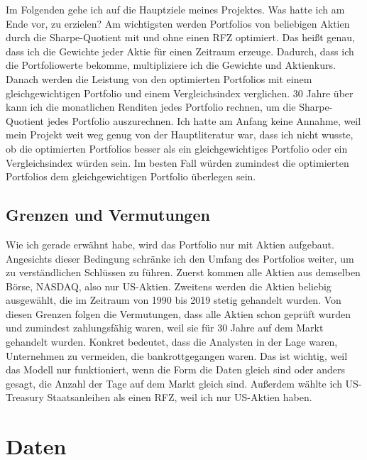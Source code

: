\documentclass[12pt]{article}
\begin{document}
            Im Folgenden gehe ich auf die Hauptziele meines Projektes. 
            Was hatte ich am Ende vor, zu erzielen? 
            Am wichtigsten werden Portfolios von beliebigen Aktien durch die Sharpe-Quotient mit und
            ohne einen RFZ optimiert. Das heißt genau, dass ich die Gewichte jeder Aktie für einen Zeitraum erzeuge. 
            Dadurch, dass ich die Portfoliowerte bekomme, multipliziere ich die Gewichte und Aktienkurs. 
            Danach werden die Leistung von den optimierten Portfolios mit einem gleichgewichtigen Portfolio und 
            einem Vergleichsindex verglichen. 30 Jahre über kann ich die monatlichen Renditen jedes Portfolio rechnen, 
            um die Sharpe-Quotient jedes Portfolio auszurechnen. 
            Ich hatte am Anfang keine Annahme, weil mein Projekt weit weg genug von der Hauptliteratur \cite{zhang2020} war, 
            dass ich nicht wusste, ob die optimierten Portfolios besser als ein gleichgewichtiges Portfolio oder 
            ein Vergleichsindex würden sein. 
            Im besten Fall würden zumindest die optimierten Portfolios dem gleichgewichtigen Portfolio überlegen sein.

        \subsection{Grenzen und Vermutungen}
    
            Wie ich gerade erwähnt habe, wird das Portfolio nur mit Aktien aufgebaut. 
            Angesichts dieser Bedingung schränke ich den Umfang des Portfolios weiter, 
            um zu verständlichen Schlüssen zu führen. Zuerst kommen alle Aktien aus demselben Börse, NASDAQ, also nur US-Aktien. 
            Zweitens werden die Aktien beliebig ausgewählt, die im Zeitraum von 1990 bis 2019 stetig gehandelt wurden. 
            Von diesen Grenzen folgen die Vermutungen, dass alle Aktien schon geprüft wurden und zumindest zahlungsfähig waren,
            weil sie für 30 Jahre auf dem Markt gehandelt wurden. 
            Konkret bedeutet, dass die Analysten in der Lage waren, Unternehmen zu vermeiden, die bankrottgegangen waren. 
            Das ist wichtig, weil das Modell nur funktioniert, wenn die Form die Daten gleich sind oder anders gesagt, 
            die Anzahl der Tage auf dem Markt gleich sind. Außerdem wählte ich US-Treasury Staatsanleihen als einen RFZ, 
            weil ich nur US-Aktien haben.
        
    \newpage \section{Daten}
            
\end{document}
